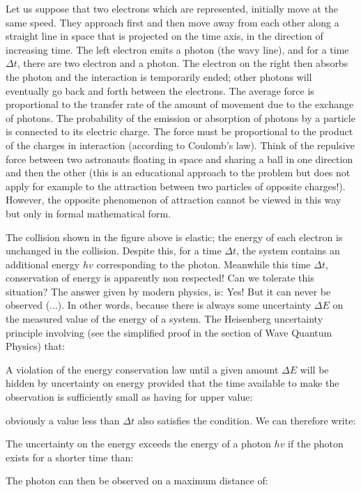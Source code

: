 	Let us suppose that two electrons which are represented, initially move at the same speed. They approach first and then move away from each other along a straight line in space that is projected on the time axis, in the direction of increasing time. The left electron emits a photon (the wavy line), and for a time $\Delta t$, there are two electron and a photon. The electron on the right then absorbs the photon and the interaction is temporarily ended; other photons will eventually go back and forth between the electrons. The average force is proportional to the transfer rate of the amount of movement due to the exchange of photons. The probability of the emission or absorption of photons by a particle is connected to its electric charge. The force must be proportional to the product of the charges in interaction (according to Coulomb's law). Think of the repulsive force between two astronauts floating in space and sharing a ball in one direction and then the other (this is an educational approach to the problem but does not apply for example to the attraction between two particles of opposite charges!). However, the opposite phenomenon of attraction cannot be viewed in this way but only in formal mathematical form.
	
	The collision shown in the figure above is elastic; the energy of each electron is unchanged in the collision. Despite this, for a time $\Delta t$, the system contains an additional energy $hv$ corresponding to the photon. Meanwhile this time $\Delta t$, conservation of energy is apparently non respected! Can we tolerate this situation? The answer given by modern physics, is: Yes! But it can never be observed (...). In other words, because there is always some uncertainty $\Delta E$ on the measured value of the energy of a system. The Heisenberg uncertainty principle involving (see the simplified proof in the section of Wave Quantum Physics) that:
	
	A violation of the energy conservation law until a given amount $\Delta E$ will be hidden by uncertainty on energy provided that the time available to make the observation is sufficiently small as having for upper value:
	
	obviously a value less than $\Delta t$ also satisfies the condition. We can therefore write:
	
	The uncertainty on the energy exceeds the energy of a photon $hv$ if the photon exists for a shorter time than:
	
	The photon can then be observed on a maximum distance of:
	
